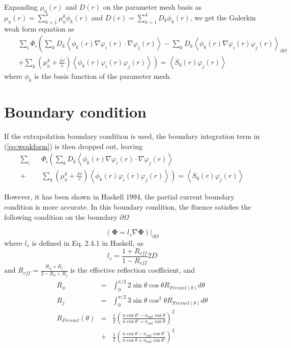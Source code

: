 \documentclass{article}
\begin{document}
Expanding $\mu_a(r)$ and $D(r)$ on the parameter mesh basis as
$\mu_a(r)=\sum_{k=1}^{4}\mu_a^k\phi_k(r)$ and
$D(r)=\sum_{k=1}^{4}D_k\phi_k(r)$, we get the Galerkin weak form
equation as
\begin{eqnarray}
\label{eq:weakform}\nonumber&&\sum_{i}\Phi_i\left(\sum_{k}D_k\left\langle
\phi_k(r)\nabla\varphi_i(r)\cdot\nabla\varphi_j(r)\right\rangle -
\sum_{k}D_k\left\langle
\phi_k(r)\nabla\varphi_i(r)\varphi_j(r)\right\rangle_{\partial\Omega}\right.
\\&&\left.+\sum_{k}\left(\mu_{a}^k+\frac{j\omega}{c}\right)\left\langle\phi_k(r)\varphi_i(r)\varphi_j(r)\right\rangle\right)=\left\langle
S_0(r)\varphi_j(r)\right\rangle
\end{eqnarray}
where $\phi_k$ is the basis function of the parameter mesh.

\section{Boundary condition}

If the extrapolation boundary condition is used, the boundary
integration term in (\ref{eq:weakform}) is then dropped out,
leaving
\begin{eqnarray}
\label{eq:weakformzerobd}\sum_{i}&&\Phi_i\left(\sum_{k}D_k\left\langle
\phi_k(r)\nabla\varphi_i(r)\cdot\nabla\varphi_j(r)\right\rangle\right.\\\nonumber
+&&\left.\sum_{k}\left(\mu_{a}^k+\frac{j\omega}{c}\right)\left\langle\phi_k(r)\varphi_i(r)\varphi_j(r)\right\rangle\right)=\left\langle
S_0(r)\varphi_j(r)\right\rangle
\end{eqnarray}

However, it has been shown in Haskell 1994, the partial current boundary
condition is more accurate. In this boundary condition, the fluence
satisfies the following condition on the boundary $\partial\Omega$

\begin{equation}
\label{eq:partialcurrent} \left(\boldsymbol\Phi=l_s\nabla{\boldsymbol\Phi}\right)|_{\partial\Omega}
\end{equation}
where $l_s$ is defined in Eq. 2.4.1 in Haskell, as
\begin{equation}
l_s=\frac{1+R_{eff}}{1-R_{eff}}2D
\end{equation}
and $R_{eff}=\frac{R_\phi+R_j}{2-R_\phi+R_j}$ is the effective reflection coefficient, and 
\begin{eqnarray}
R_\phi &=& \int_0^{\pi/2}2\sin \theta \cos\theta R_{Fresnel(\theta)}d\theta\\
R_j &=& \int_0^{\pi/2}3\sin \theta \cos^2\theta R_{Fresnel(\theta)}d\theta \\
R_{Fresnel}(\theta) &=& \frac{1}{2}\left(\frac{n \cos\theta' - n_{out} \cos\theta}{n \cos\theta' + n_{out} \cos\theta}\right)^2 \\
   &+&\frac{1}{2}\left(\frac{n \cos\theta - n_{out} \cos\theta'}{n \cos\theta + n_{out} \cos\theta'}\right)^2
\end{eqnarray}
\end{document}
